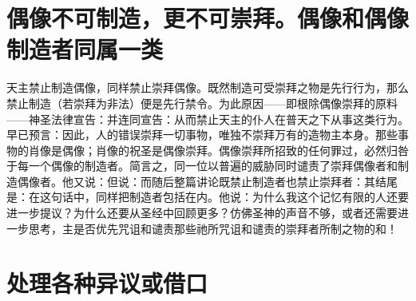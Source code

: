 
\section{偶像不可制造，更不可崇拜。偶像和偶像制造者同属一类}

天主禁止制造偶像，同样禁止崇拜偶像。既然制造可受崇拜之物是先行行为，那么禁止制造（若崇拜为非法）便是先行禁令。为此原因——即根除偶像崇拜的原料——神圣法律宣告：并连同宣告：从而禁止天主的仆人在普天之下从事这类行为。早已预言：因此，人的错误崇拜一切事物，唯独不崇拜万有的造物主本身。那些事物的肖像是偶像；肖像的祝圣是偶像崇拜。偶像崇拜所招致的任何罪过，必然归咎于每一个偶像的制造者。简言之，同一位以普遍的威胁同时谴责了崇拜偶像者和制造偶像者。他又说：但说：而随后整篇讲论既禁止制造者也禁止崇拜者：其结尾是：在这句话中，同样把制造者包括在内。他说：为什么我这个记忆有限的人还要进一步提议？为什么还要从圣经中回顾更多？仿佛圣神的声音不够，或者还需要进一步思考，主是否优先咒诅和谴责那些祂所咒诅和谴责的崇拜者所制之物的和！\par


\section{处理各种异议或借口}

